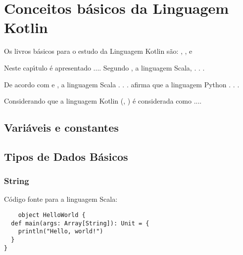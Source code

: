

\chapter{ Conceitos b\'{a}sicos da Linguagem Kotlin}

Os livros b\'{a}sicos para o estudo da Linguagem Kotlin s\~{a}o: \cite{Whaling2020}, \cite{Wampler2021}, \cite{Hunt2018} e \cite{Upadhyaya2019}

Neste cap\'{\i}tulo \'{e} apresentado ....  Segundo \cite{Hunt2018}, a linguagem Scala,  . . .

De acordo com \cite{Sebesta2018} e \cite{roy04}, a linguagem Scala . . . \cite{Sebesta2018} afirma que a linguagem Python . . .

Considerando que a linguagem Kotlin (\cite{Whaling2020}, \cite{Upadhyaya2019}) \'{e} considerada como ....

    \section{Vari\'{a}veis e constantes}


    \section{Tipos de Dados B\'{a}sicos}

            \subsection{String}

    C\'{o}digo fonte para a linguagem Scala:
    \begin{lstlisting}
    object HelloWorld {
  def main(args: Array[String]): Unit = {
    println("Hello, world!")
  }
}
    \end{lstlisting}

